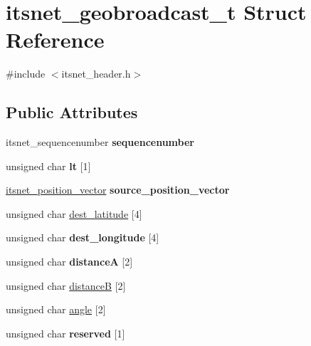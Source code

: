\hypertarget{structitsnet__geobroadcast__t}{\section{itsnet\-\_\-geobroadcast\-\_\-t \-Struct \-Reference}
\label{structitsnet__geobroadcast__t}
}


{\ttfamily \#include $<$itsnet\-\_\-header.\-h$>$}

\subsection*{\-Public \-Attributes}
\begin{DoxyCompactItemize}
\item 
\hypertarget{structitsnet__geobroadcast__t_abf77717572cc0153ef15879021cbe873}{itsnet\-\_\-sequencenumber {\bfseries sequencenumber}}\label{structitsnet__geobroadcast__t_abf77717572cc0153ef15879021cbe873}

\item 
\hypertarget{structitsnet__geobroadcast__t_a209ace7e78e5217d1370ce616e4ee43b}{unsigned char {\bfseries lt} \mbox{[}1\mbox{]}}\label{structitsnet__geobroadcast__t_a209ace7e78e5217d1370ce616e4ee43b}

\item 
\hypertarget{structitsnet__geobroadcast__t_a56eb796ffe3f3a90ffba5ae7209952b5}{\hyperlink{structitsnet__position__vector}{itsnet\-\_\-position\-\_\-vector} {\bfseries source\-\_\-position\-\_\-vector}}\label{structitsnet__geobroadcast__t_a56eb796ffe3f3a90ffba5ae7209952b5}

\item 
unsigned char \hyperlink{structitsnet__geobroadcast__t_a12f315d101954aa288cfc80d5724e822}{dest\-\_\-latitude} \mbox{[}4\mbox{]}
\item 
\hypertarget{structitsnet__geobroadcast__t_a9e3cf6d6dc74ce5142a5326ad2072862}{unsigned char {\bfseries dest\-\_\-longitude} \mbox{[}4\mbox{]}}\label{structitsnet__geobroadcast__t_a9e3cf6d6dc74ce5142a5326ad2072862}

\item 
\hypertarget{structitsnet__geobroadcast__t_aae53bc7fa6e340dfb3bff18999b9e83e}{unsigned char {\bfseries distance\-A} \mbox{[}2\mbox{]}}\label{structitsnet__geobroadcast__t_aae53bc7fa6e340dfb3bff18999b9e83e}

\item 
unsigned char \hyperlink{structitsnet__geobroadcast__t_a6671b5efdf17e4669fa67097f0745bbc}{distance\-B} \mbox{[}2\mbox{]}
\item 
unsigned char \hyperlink{structitsnet__geobroadcast__t_ad01fb56d9a376337c02d140df82877c4}{angle} \mbox{[}2\mbox{]}
\item 
\hypertarget{structitsnet__geobroadcast__t_a73b341ec71f0076b0f42362fd7012c76}{unsigned char {\bfseries reserved} \mbox{[}1\mbox{]}}\label{structitsnet__geobroadcast__t_a73b341ec71f0076b0f42362fd7012c76}


\end{DoxyCompactItemize}
